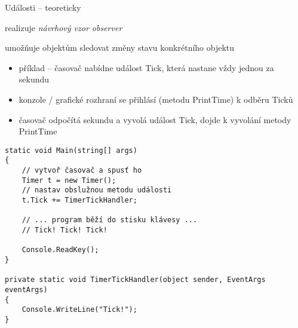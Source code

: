 

\zkouskove


\begin{frame}[fragile]
\begin{bitemize}{Události -- teoreticky}
\item realizuje \textit{návrhový vzor observer}
\item umožňuje objektům sledovat změny stavu konkrétního objektu
\begin{itemize}
\item příklad -- časovač nabídne událost Tick, která nastane vždy jednou za sekundu
\item konzole / grafické rozhraní se přihlásí (metodu PrintTime) k odběru Ticků
\item časovač odpočítá sekundu a vyvolá událost Tick, dojde k vyvolání metody PrintTime
\end{itemize}

\end{bitemize}
\end{frame}



\begin{frame}[fragile]
\begin{yesblock}
\begin{lstlisting}
static void Main(string[] args)
{
	// vytvoř časovač a spusť ho
    Timer t = new Timer();
    // nastav obslužnou metodu události
    t.Tick += TimerTickHandler;

    // ... program běží do stisku klávesy ...
    // Tick! Tick! Tick!

    Console.ReadKey();
}

private static void TimerTickHandler(object sender, EventArgs eventArgs)
{
    Console.WriteLine("Tick!");
}
\end{lstlisting}
\end{yesblock}
\end{frame}



